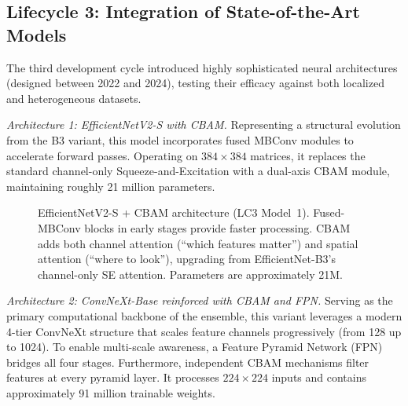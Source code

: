 \documentclass[12pt,a4paper]{report}
\begin{document}
\subsection{Lifecycle 3: Integration of State-of-the-Art Models}
The third development cycle introduced highly sophisticated neural architectures (designed between 2022 and 2024), testing their efficacy against both localized and heterogeneous datasets.

\textit{Architecture 1: EfficientNetV2-S with CBAM.} Representing a structural evolution from the B3 variant, this model incorporates fused MBConv modules to accelerate forward passes. Operating on $384\times384$ matrices, it replaces the standard channel-only Squeeze-and-Excitation with a dual-axis CBAM module, maintaining roughly 21 million parameters.

\begin{figure}[H]
\centering
{}
\caption{EfficientNetV2-S + CBAM architecture (LC3 Model~1). Fused-MBConv blocks in early stages provide faster processing. CBAM adds both channel attention (``which features matter'') and spatial attention (``where to look''), upgrading from EfficientNet-B3's channel-only SE attention. Parameters are approximately 21M.}
\label{fig:arch_effnetv2_cbam}
\end{figure}

\textit{Architecture 2: ConvNeXt-Base reinforced with CBAM and FPN.} Serving as the primary computational backbone of the ensemble, this variant leverages a modern 4-tier ConvNeXt structure \cite{liu2022convnext} that scales feature channels progressively (from 128 up to 1024). To enable multi-scale awareness, a Feature Pyramid Network (FPN) \cite{lin2017fpn} bridges all four stages. Furthermore, independent CBAM mechanisms filter features at every pyramid layer. It processes $224\times224$ inputs and contains approximately 91 million trainable weights.
\end{document}
